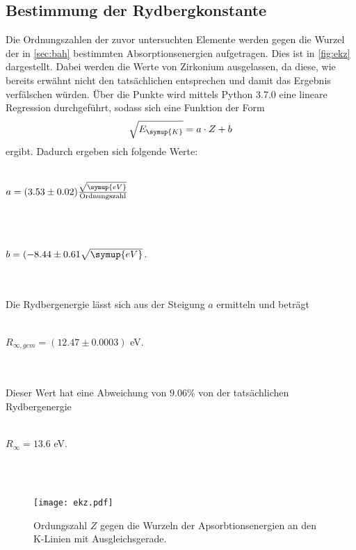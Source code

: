     \subsection{Bestimmung der Rydbergkonstante}  
        Die Ordnungszahlen der zuvor untersuchten Elemente werden gegen die Wurzel der in \autoref{sec:bah} bestimmten Absorptionsenergien
        aufgetragen. Dies ist in \autoref{fig:ekz} dargestellt. Dabei werden die Werte von Zirkonium ausgelassen, da diese, wie bereits 
        erwähnt nicht den tatsächlichen entsprechen und damit das Ergebnis verfälschen würden.
        Über die Punkte wird mittels Python 3.7.0 eine lineare Regression durchgeführt, sodass sich eine Funktion der Form
        \begin{equation}
        \label{eqn:regress}
            \sqrt{E_{\symup{K}}} = a \cdot Z + b
        \end{equation}
        ergibt. Dadurch ergeben sich folgende Werte:
        \\ \\
        \centerline{$a = (3.53 \pm 0.02) \frac{\sqrt{\symup{eV}}}{\text{Ordnungszahl}} $}
        \\ \\
        \centerline{$b = (-8.44 \pm 0.61 \sqrt{\symup{eV}}$.}
        \\ \\
        Die Rydbergenergie lässt sich aus der Steigung $a$ ermitteln und beträgt
        \\ \\
        \centerline{$R_{\infty, gem} = (12.47 \pm 0.0003)$ eV.}
        \\ \\
        Dieser Wert hat eine Abweichung von $9.06 \%$ von der tatsächlichen Rydbergenergie
        \\ \\
        \centerline{$R_{\infty} = 13.6$ eV.}
        \\ \\
        \begin{figure}
            \centering
            \texttt{[image: ekz.pdf]}
            \caption{Ordungszahl $Z$ gegen die Wurzeln der Apsorbtionsenergien an den K-Linien mit Ausgleichsgerade.}
            \label{fig:ekz}
        \end{figure}


